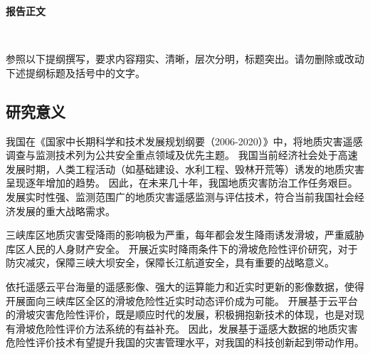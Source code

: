 \documentclass[a4paper,zihao=-4]{article}
\begin{document}
\kaishu

\setlength{\abovedisplayskip}{0pt}
\setlength{\belowdisplayskip}{0pt}

\begin{center}
	{\kaishu {} \textbf{报告正文} \vspace{-3ex}}
\end{center}  

\thispagestyle{empty} 　　　%

{\kaishu {}参照以下提纲撰写，要求内容翔实、清晰，层次分明，标题突出。}\alert{请勿删除或改动下述提纲标题及括号中的文字。\vspace{9bp}}



\subsection{研究意义}

我国在《国家中长期科学和技术发展规划纲要（2006-2020）》中，将地质灾害遥感调查与监测技术列为公共安全重点领域及优先主题。
我国当前经济社会处于高速发展时期，人类工程活动（如基础建设、水利工程、毁林开荒等）诱发的地质灾害呈现逐年增加的趋势。
因此，在未来几十年，我国地质灾害防治工作任务艰巨。发展实时性强、监测范围广的地质灾害遥感监测与评估技术，符合当前我国社会经济发展的重大战略需求。

三峡库区地质灾害受降雨的影响极为严重，每年都会发生降雨诱发滑坡，严重威胁库区人民的人身财产安全。
开展近实时降雨条件下的滑坡危险性评价研究，对于防灾减灾，保障三峡大坝安全，保障长江航道安全，具有重要的战略意义。

依托遥感云平台海量的遥感影像、强大的运算能力和近实时更新的影像数据，使得开展面向三峡库区全区的滑坡危险性近实时动态评价成为可能。
开展基于云平台的滑坡灾害危险性评价，既是顺应时代的发展，积极拥抱新技术的体现，也是对现有滑坡危险性评价方法系统的有益补充。
因此，发展基于遥感大数据的地质灾害危险性评价技术有望提升我国的灾害管理水平，对我国的科技创新起到带动作用。
\end{document}
